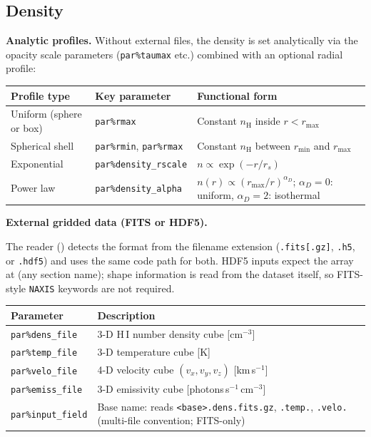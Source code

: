 \documentclass[english,a4paper]{my_memo}
\newcommand{\parm}[1]{\texttt{par\%#1}}
\newcommand{\ion}[2]{#1\,{\scriptsize #2}}
\begin{document}
\subsection{Density}
\label{sec:density}

\textbf{Analytic profiles.}
Without external files, the density is set analytically via the opacity scale parameters
(\parm{taumax} etc.) combined with an optional radial profile:

\begin{center}
\begin{tabular}{@{}l@{\hspace{1.5em}}l@{\hspace{1.5em}}l@{}}
\toprule
Profile type & Key parameter & Functional form \\
\midrule
Uniform (sphere or box) & \parm{rmax} & Constant $n_\mathrm{H}$ inside $r < r_\text{max}$ \\
Spherical shell & \parm{rmin}, \parm{rmax} & Constant $n_\mathrm{H}$ between $r_\text{min}$ and $r_\text{max}$ \\
Exponential & \parm{density\_rscale} & $n \propto \exp(-r/r_s)$ \\
Power law & \parm{density\_alpha} & $n(r) \propto (r_\text{max}/r)^{\alpha_D}$; $\alpha_D{=}0$: uniform, $\alpha_D{=}2$: isothermal \\
\bottomrule
\end{tabular}
\end{center}

\textbf{External gridded data (FITS or HDF5).}

\begin{sloppypar}
The reader () detects the format from the
filename extension (\texttt{.fits[.gz]}, \texttt{.h5}, or \texttt{.hdf5})
and uses the same code path for both.  HDF5 inputs expect the array at
 (any section name); shape information is read
from the dataset itself, so FITS-style \texttt{NAXIS} keywords are not
required.
\end{sloppypar}

\begin{center}
\begin{tabular}{L{3.2cm}L{10cm}}
\toprule
Parameter & Description \\
\midrule
\parm{dens\_file}  & 3-D \ion{H}{I} number density cube [cm$^{-3}$] \\
\parm{temp\_file}  & 3-D temperature cube [K] \\
\parm{velo\_file}  & 4-D velocity cube $(v_x,v_y,v_z)$ [km\,s$^{-1}$] \\
\parm{emiss\_file} & 3-D emissivity cube [photons\,s$^{-1}$\,cm$^{-3}$] \\
\parm{input\_field} & Base name: reads \texttt{<base>.dens.fits.gz}, \texttt{.temp.}, \texttt{.velo.} (multi-file convention; FITS-only) \\
\bottomrule
\end{tabular}
\end{center}
\end{document}
